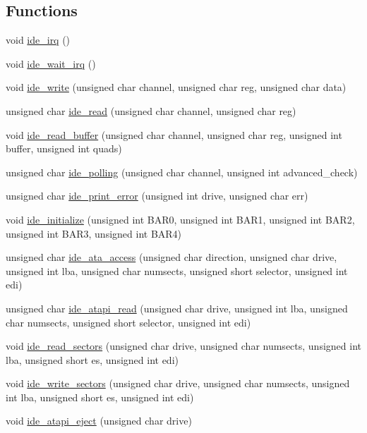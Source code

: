 \subsection*{Functions}
\begin{DoxyCompactItemize}
\item 
void \hyperlink{a00023_ad7ea572af581cc0623a2fb74a579ca83_ad7ea572af581cc0623a2fb74a579ca83}{ide\+\_\+irq} ()
\item 
void \hyperlink{a00023_a31655fcec0cc8f9f8792b98cd4441fdf_a31655fcec0cc8f9f8792b98cd4441fdf}{ide\+\_\+wait\+\_\+irq} ()
\item 
void \hyperlink{a00023_afdb22c37a32d86fcb64e55b3edab4790_afdb22c37a32d86fcb64e55b3edab4790}{ide\+\_\+write} (unsigned char channel, unsigned char reg, unsigned char data)
\item 
unsigned char \hyperlink{a00023_aef734da4bdc0c1d014528fd2f66e0686_aef734da4bdc0c1d014528fd2f66e0686}{ide\+\_\+read} (unsigned char channel, unsigned char reg)
\item 
void \hyperlink{a00023_ac338a611110448d6bd9b8edc491ed19b_ac338a611110448d6bd9b8edc491ed19b}{ide\+\_\+read\+\_\+buffer} (unsigned char channel, unsigned char reg, unsigned int buffer, unsigned int quads)
\item 
unsigned char \hyperlink{a00023_a03e85b94d6fbfb957e1b88c3dd064eca_a03e85b94d6fbfb957e1b88c3dd064eca}{ide\+\_\+polling} (unsigned char channel, unsigned int advanced\+\_\+check)
\item 
unsigned char \hyperlink{a00023_af7757307613c29c9bcbf0f8f5b2feee5_af7757307613c29c9bcbf0f8f5b2feee5}{ide\+\_\+print\+\_\+error} (unsigned int drive, unsigned char err)
\item 
void \hyperlink{a00023_ab5397c8432be802172da8f04c8840ca3_ab5397c8432be802172da8f04c8840ca3}{ide\+\_\+initialize} (unsigned int B\+A\+R0, unsigned int B\+A\+R1, unsigned int B\+A\+R2, unsigned int B\+A\+R3, unsigned int B\+A\+R4)
\item 
unsigned char \hyperlink{a00023_a4da0883393a98b937fdc3015a0a3f265_a4da0883393a98b937fdc3015a0a3f265}{ide\+\_\+ata\+\_\+access} (unsigned char direction, unsigned char drive, unsigned int lba, unsigned char numsects, unsigned short selector, unsigned int edi)
\item 
unsigned char \hyperlink{a00023_a1652da42785708fa6ea21ce4aef8c628_a1652da42785708fa6ea21ce4aef8c628}{ide\+\_\+atapi\+\_\+read} (unsigned char drive, unsigned int lba, unsigned char numsects, unsigned short selector, unsigned int edi)
\item 
void \hyperlink{a00023_a9dd84843412753d236e17a15277c5b98_a9dd84843412753d236e17a15277c5b98}{ide\+\_\+read\+\_\+sectors} (unsigned char drive, unsigned char numsects, unsigned int lba, unsigned short es, unsigned int edi)
\item 
void \hyperlink{a00023_a8632fb3a8cd41b7d60ee56942afbde03_a8632fb3a8cd41b7d60ee56942afbde03}{ide\+\_\+write\+\_\+sectors} (unsigned char drive, unsigned char numsects, unsigned int lba, unsigned short es, unsigned int edi)
\item 
void \hyperlink{a00023_a92d054539c112a72e080e35a3341b0b9_a92d054539c112a72e080e35a3341b0b9}{ide\+\_\+atapi\+\_\+eject} (unsigned char drive)
\end{DoxyCompactItemize}
